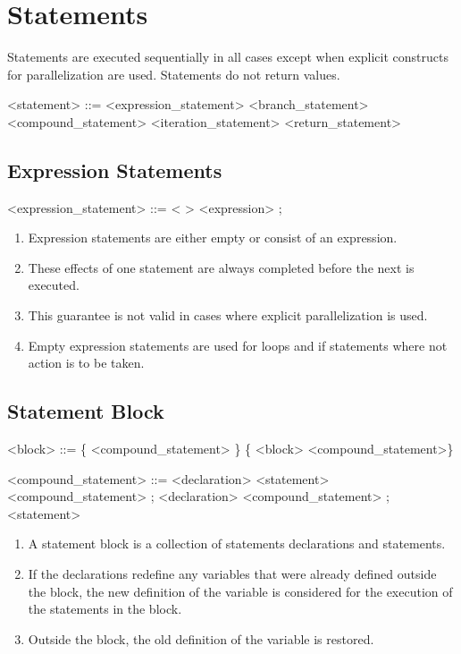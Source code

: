 \section{Statements}
Statements are executed sequentially in all cases except when explicit constructs for parallelization are used. Statements do not return values.

\begin{grammar}
<statement> ::= <expression_statement>
	\alt <branch_statement>
	\alt <compound_statement>
	\alt <iteration_statement>
	\alt <return_statement>
\end{grammar}

\subsection{Expression Statements}
\begin{grammar}
<expression_statement> ::= < >
	\alt <expression> ;
\end{grammar}
\begin{enumerate}
	\item Expression statements are either empty or consist of an expression.
	\item These effects of one statement are always completed before the next is executed.
	\item This guarantee is not valid in cases where explicit parallelization is used.
	\item Empty expression statements are used for loops and if statements where not action is to be taken.
\end{enumerate}


\subsection{Statement Block}
\begin{grammar}
<block> ::= \{ <compound_statement> \}
	\alt \{ <block> <compound_statement>\}

<compound_statement> ::= <declaration>
	\alt <statement>
	\alt <compound_statement> ; <declaration>
	\alt <compound_statement> ; <statement>
\end{grammar}
\begin{enumerate}
	\item A statement block is a collection of statements declarations and statements.
	\item If the declarations redefine any variables that were already defined outside the block, the new definition of the variable is considered for the execution of the statements in the block.
	\item Outside the block, the old definition of the variable is restored.
\end{enumerate}

